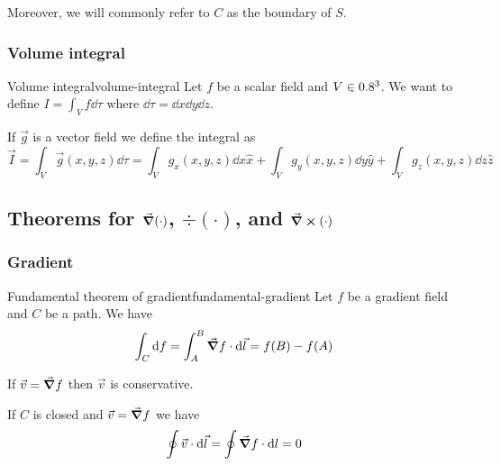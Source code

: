 \documentclass[12pt]{extarticle}
\begin{document}
Moreover, we will commonly refer to $C$ as the boundary of $S$.

\subsubsection{Volume integral}

\begin{definition}{Volume integral}{volume-integral}
	Let $f$ be a scalar field and $V \in 0.8^3$.
	We want to define $I = \int_V f \dd{\tau}$ where $\dd{\tau} = \dd{x} \dd{y} \dd{z}$.

	If $\vec g$ is a vector field we define the integral as
	\begin{equation}
		\vec I = \int_V \vec g(x, y, z) \dd{\tau} = \int_V g_x (x, y, z) \dd{x} \hat x + \int_V g_y (x, y, z) \dd{y} \hat y + \int_V g_z (x, y, z) \dd{z} \hat z
	\end{equation}
\end{definition}

\subsection{Theorems for \texorpdfstring{$\grad(\mathord{\cdot})$, $\div(\mathord{\cdot})$, and $\curl(\mathord{\cdot}) $}{gradient, divergence and curl}}

\subsubsection{Gradient}

\begin{theorem}{Fundamental theorem of gradient}{fundamental-gradient}
	Let $f$ be a gradient field and $C$ be a path. We have
	\begin{equation}
		\int_C \dd{f} = \int_A^B \grad f \cdot \dd{\vec l} = f(B)- f(A)
	\end{equation}
\end{theorem}

\begin{corollary}{}{}
	If $\vec v = \grad f$ then $\vec v$ is conservative.
\end{corollary}

\begin{corollary}{}{}
	If $C$ is closed and $\vec v = \grad f$ we have
	\begin{equation}
		\oint \vec v \cdot \dd{\vec l} = \oint \grad f \cdot \dd{l} = 0
	\end{equation}
\end{corollary}
\end{document}
